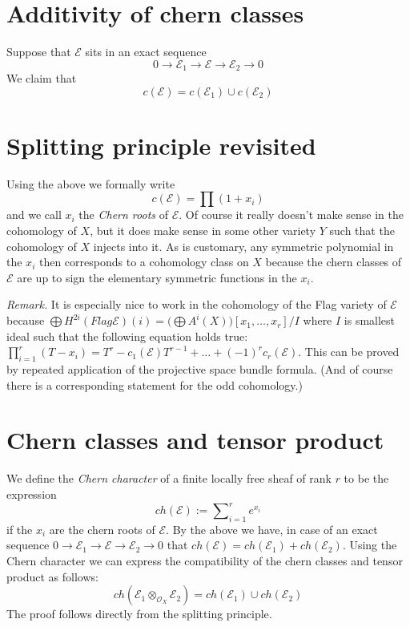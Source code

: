 \section{Additivity of chern classes}
\label{section-additivity-chern-classes}

\noindent
Suppose that ${\mathcal E}$ sits in an
exact sequence
$$
0
\to
{\mathcal E}_1
\to 
{\mathcal E}
\to 
{\mathcal E}_2
\to 
0
$$
We claim that
$$
c({\mathcal E}) = c({\mathcal E}_1) \cup c({\mathcal E}_2)
$$




\section{Splitting principle revisited}
\label{section-splitting-revisited}

\noindent
Using the above
we formally write
$$
c({\mathcal E}) = \prod\nolimits (1+x_i)
$$
and we call $x_i$ the {\it Chern roots} of ${\mathcal E}$.
Of course it really doesn't make sense in the cohomology 
of $X$, but it does make sense in some other variety
$Y$ such that the cohomology of $X$ injects into it.
As is customary, any symmetric polynomial in the $x_i$
then corresponds to a cohomology class on $X$ because
the chern classes of ${\mathcal E}$ are up to sign the 
elementary symmetric functions in the $x_i$.

\medskip\noindent
{\it Remark.} It is especially nice to work in the
cohomology of the Flag variety of ${\mathcal E}$ because
$ \bigoplus H^{2i}(Flag{\mathcal E})(i) =
\big(\bigoplus A^{i}(X)\big) [x_1,\ldots,x_r]/I $
where $I$ is smallest ideal such that the following
equation holds true:
$ \prod_{i=1}^r (T - x_i) =  T^r - c_1({\mathcal E}) T^{r-1}+ \ldots
+ (-1)^r c_r({\mathcal E})$. This can be proved by repeated application
of the projective space bundle formula. (And of course there
is a corresponding statement for the odd cohomology.)





\section{Chern classes and tensor product}
\label{section-chern-classes-tensor}

\noindent
We define the {\it Chern character} of a finite locally free
sheaf of rank $r$ to be the expression
$$
ch({\mathcal E}) := \sum\nolimits_{i=1}^r e^{x_i}
$$
if the $x_i$ are the chern roots of ${\mathcal E}$. By the above
we have, in case of an exact sequence
$
0
\to
{\mathcal E}_1
\to 
{\mathcal E}
\to 
{\mathcal E}_2
\to 
0
$
that $ch({\mathcal E}) = ch({\mathcal E}_1) + ch({\mathcal E}_2)$. 
Using the Chern character we can express the compatibility
of the chern classes and tensor product as follows:
$$
ch({\mathcal E}_1 \otimes_{{\mathcal O}_X} {\mathcal E}_2) =
ch({\mathcal E}_1) \cup ch({\mathcal E}_2)
$$
The proof follows directly from the splitting principle.




